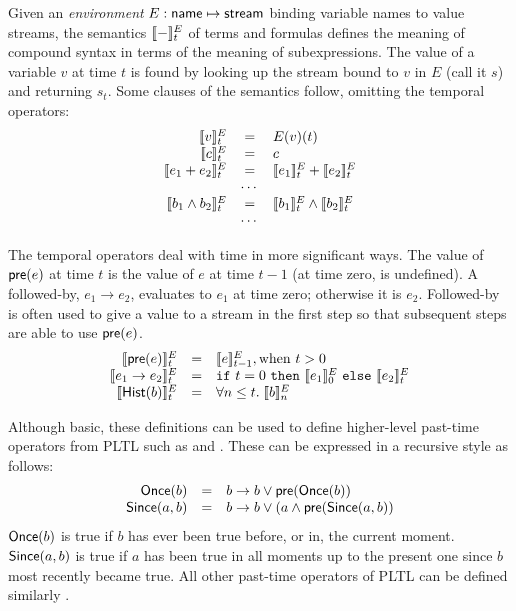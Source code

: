 Given an \emph{environment} $E : \mathsf{name} \mapsto \mathsf{stream}$
binding variable names to value streams, the semantics $[\![ - ]\!]^E_t$
of terms and formulas defines the meaning of compound syntax in terms
of the meaning of subexpressions. The value of a variable $v$ at time
$t$ is found by looking up the stream bound to $v$ in $E$ (call it
$s$) and returning $s_t$. Some clauses of the semantics follow,
omitting the temporal operators:
\[
\begin{array}{rcl}
\sem{v}^E_t & = & E(v)(t) \\
\sem{c}^E_t & = & c \\
\sem{e_1 + e_2}^E_t & = & \sem{e_1}^E_t + \sem{e_2}^E_t \\
   & \cdots & \\
\sem{b_1 \land b_2}^E_t & = & \sem{b_1}^E_t \land \sem{b_2}^E_t \\
   & \cdots & \\
\end{array}
\]

The temporal operators deal with time in more significant ways. The
value of $\mathsf{pre}(e)$ at time $t$ is the value of $e$ at time
$t-1$ (at time zero,  is undefined).
A followed-by, $e_1 \to e_2$, evaluates to $e_1$ at time zero; otherwise it is $e_2$.
Followed-by is often used to give a value to a stream in the first step so that subsequent steps are able to use $\mathsf{pre}(e)$.
\[
\begin{array}{rcl}
\sem{\konst{pre}(e)}^E_t & = & \sem{e}^E_{t-1}, \mathrm{when}\ t > 0 \\
\sem{e_1 \to e_2}^E_t & = & \itelse{t=0}{\sem{e_1}^E_0}{\sem{e_2}^E_t} \\
\sem{\konst{Hist}(b)}^E_t & = & \forall n \leq t.\; \sem{b}^E_n
\end{array}
\]

Although basic, these definitions can be used to define higher-level
past-time operators from PLTL such as  and .
These can be expressed in a recursive style as follows:
\[
\begin{array}{rcl}
\mathsf{Once}(b) & = & b \to b \vee \mathsf{pre}(\mathsf{Once}(b)) \\
\mathsf{Since}(a, b) & = & b \to b \lor (a \land \mathsf{pre}(\mathsf{Since}(a, b))
\end{array}
\]
\noindent $\mathsf{Once}(b)$ is true if $b$ has ever been true before, or in, the
current moment.  $\mathsf{Since}(a, b)$ is true if $a$ has been true in
all moments up to the present one since $b$ most recently became true.
All other past-time operators of PLTL can be defined similarly \cite{monitor}.
